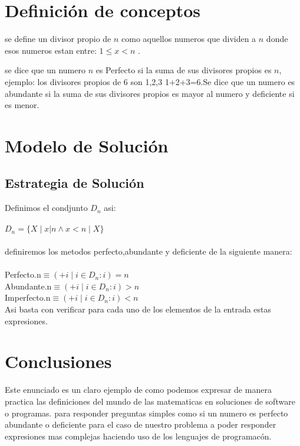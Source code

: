 \documentclass[12pt]{article}
\begin{document}
\section {Definici\'on de conceptos}
\item se define un divisor propio de $n$ como aquellos numeros que dividen a $n$  donde esos numeros estan entre: $1\leq x<n$ .
\item se dice que un numero $n$ es Perfecto si la suma de sus divisores propios es $n$, ejemplo: los divisores propios de 6 son 1,2,3  1+2+3=6.Se dice que un numero es abundante si la suma de sus divisores propios es mayor al numero y deficiente si es menor.
\section{Modelo de Soluci\'on}
\subsection{Estrategia de Soluci\'on}
Definimos el condjunto $D_n$ asi:
\\
\\$D_n=\{X\mid x|n \wedge x<n \mid X\}$
\\
\\definiremos los metodos perfecto,abundante y deficiente de la siguiente manera:
\\
\\Perfecto.n$\equiv (+i\mid i\in D_n:i)=n$
\\Abundante.n$\equiv (+i\mid i\in D_n:i)>n$
\\Imperfecto.n$\equiv (+i\mid i\in D_n:i)<n$
\\
Asi basta con verificar para cada uno de los elementos de la entrada estas expresiones.
\newpage
\section{Conclusiones}
Este enunciado es un claro ejemplo de como podemos expresar  de manera practica las definiciones del mundo de las matematicas en soluciones de software o programas. para responder preguntas simples como si un numero es perfecto abundante o deficiente para el caso de nuestro problema a poder responder expresiones mas complejas haciendo uso de los lenguajes de programac\'on.
\end{document}
